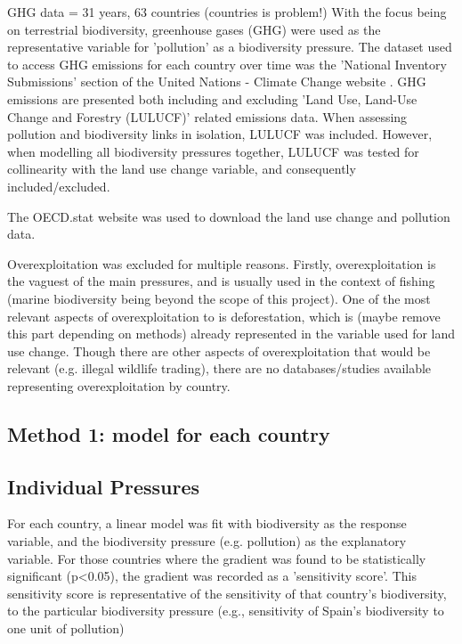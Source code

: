 \documentclass[11pt, a4paper, titlepage]{article}
\begin{document}
	GHG data = 31 years, 63 countries (countries is problem!)
	With the focus being on terrestrial biodiversity, greenhouse gases (GHG) were used as the representative variable for 'pollution' as a biodiversity pressure. The dataset used to access GHG emissions for each country over time was the 'National Inventory Submissions' section of the United Nations - Climate Change website \citep{united nations}. GHG emissions are presented both including and excluding 'Land Use, Land-Use Change and Forestry (LULUCF)' related emissions data. When assessing pollution and biodiversity links in isolation, LULUCF was included. However, when modelling all biodiversity pressures together, LULUCF was tested for collinearity with the land use change variable, and consequently included/excluded. \newline
	
	The OECD.stat website was used to download the land use change and pollution data. \newline
	
	Overexploitation was excluded for multiple reasons. Firstly, overexploitation is the vaguest of the main pressures, and is usually used in the context of fishing (marine biodiversity being beyond the scope of this project). One of the most relevant aspects of overexploitation to is deforestation, which is (maybe remove this part depending on methods) already represented in the variable used for land use change. Though there are other aspects of overexploitation that would be relevant (e.g. illegal wildlife trading), there are no databases/studies available representing overexploitation by country.

	\subsection*{Method 1: model for each country}

	\subsection*{Individual Pressures}
	
	For each country, a linear model was fit with biodiversity as the response variable, and the biodiversity pressure (e.g. pollution) as the explanatory variable. For those countries where the gradient was found to be statistically significant (p<0.05), the gradient was recorded as a 'sensitivity score'. This sensitivity score is representative of the sensitivity of that country's biodiversity, to the particular biodiversity pressure (e.g., sensitivity of Spain's biodiversity to one unit of pollution) \newline
	
\end{document}

